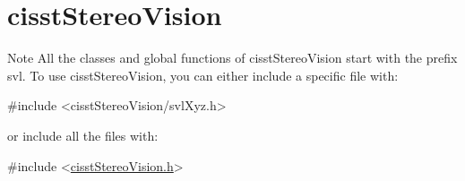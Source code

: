 \hypertarget{group__cisst_stereo_vision}{\section{cisst\-Stereo\-Vision}
\label{group__cisst_stereo_vision}
}
\begin{DoxyNote}{Note}
All the classes and global functions of cisst\-Stereo\-Vision start with the prefix svl. To use cisst\-Stereo\-Vision, you can either include a specific file with\-: 
\begin{DoxyCode}
\textcolor{preprocessor}{#include <cisstStereoVision/svlXyz.h>}
\end{DoxyCode}
 or include all the files with\-: 
\begin{DoxyCode}
\textcolor{preprocessor}{#include <\hyperlink{cisst_stereo_vision_8h}{cisstStereoVision.h}>}
\end{DoxyCode}
 
\end{DoxyNote}
